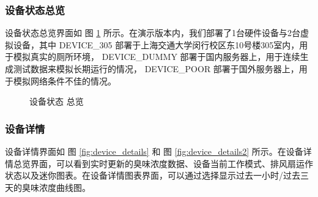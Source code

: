\documentclass[UTF8]{ctexart}
\begin{document}
\subsubsection{设备状态总览}
设备状态总览界面如 图 \ref{fig:device_overall} 所示。在演示版本内，我们部署了1台硬件设备与2台虚拟设备，其中 DEVICE\_305 部署于上海交通大学闵行校区东10号楼305室内，用于模拟真实的厕所环境， DEVICE\_DUMMY 部署于国内服务器上，用于连续生成测试数据来模拟长期运行的情况， DEVICE\_POOR 部署于国外服务器上，用于模拟网络条件不佳的情况。
\begin{figure}[H]
    \noindent{}
    \caption{设备状态 总览}\label{fig:device_overall}
\end{figure}
\subsubsection{设备详情}
设备详情界面如 图 \ref{fig:device_details} 和 图 \ref{fig:device_details2} 所示。在设备详情总览界面，可以看到实时更新的臭味浓度数据、设备当前工作模式、排风扇运作状态以及迷你图表。在设备详情图表界面，可以通过选择显示过去一小时/过去三天的臭味浓度曲线图。
\end{document}
